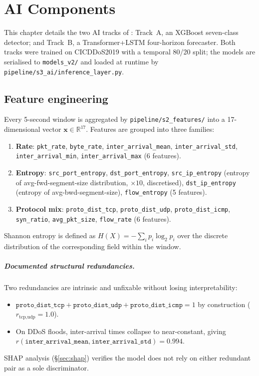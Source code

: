 \chapter{AI Components}
\label{ch:ai}

This chapter details the two AI tracks of \padonap{}: Track~A, an
XGBoost seven-class detector; and Track~B, a Transformer+LSTM
four-horizon forecaster. Both tracks were trained on CICDDoS2019 with
a temporal 80/20 split; the models are serialised to
\texttt{models\_v2/} and loaded at runtime by
\texttt{pipeline/s3\_ai/inference\_layer.py}.

\section{Feature engineering}
\label{sec:features}

Every 5-second window is aggregated by \texttt{pipeline/s2\_features/}
into a 17-dimensional vector $\mathbf{x} \in \mathbb{R}^{17}$.
Features are grouped into three families:

\begin{enumerate}
  \item \textbf{Rate}: \texttt{pkt\_rate}, \texttt{byte\_rate},
        \texttt{inter\_arrival\_mean}, \texttt{inter\_arrival\_std},
        \texttt{inter\_arrival\_min}, \texttt{inter\_arrival\_max}
        (6 features).
  \item \textbf{Entropy}: \texttt{src\_port\_entropy},
        \texttt{dst\_port\_entropy}, \texttt{src\_ip\_entropy}
        (entropy of avg-fwd-segment-size distribution, $\times 10$,
        discretised), \texttt{dst\_ip\_entropy} (entropy of
        avg-bwd-segment-size), \texttt{flow\_entropy}
        (5 features).
  \item \textbf{Protocol mix}: \texttt{proto\_dist\_tcp},
        \texttt{proto\_dist\_udp}, \texttt{proto\_dist\_icmp},
        \texttt{syn\_ratio}, \texttt{avg\_pkt\_size},
        \texttt{flow\_rate} (6 features).
\end{enumerate}

Shannon entropy is defined as
$H(X) = -\sum_i p_i \log_2 p_i$
over the discrete distribution of the corresponding field within
the window.

\paragraph{Documented structural redundancies.}
Two redundancies are intrinsic and unfixable without losing
interpretability:
\begin{itemize}
  \item $\texttt{proto\_dist\_tcp} + \texttt{proto\_dist\_udp} +
        \texttt{proto\_dist\_icmp} = 1$ by construction
        ($r_{\text{tcp,udp}} = 1.0$).
  \item On DDoS floods, inter-arrival times collapse to near-constant,
        giving $r(\texttt{inter\_arrival\_mean},
        \texttt{inter\_arrival\_std}) = 0.994$.
\end{itemize}
SHAP analysis (\S\ref{sec:shap}) verifies the model does not rely on
either redundant pair as a sole discriminator.

